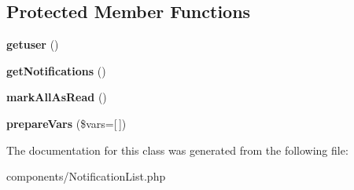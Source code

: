 \subsection*{Protected Member Functions}
\begin{DoxyCompactItemize}
\item 
\hypertarget{classDMA_1_1Friends_1_1Components_1_1NotificationList_a074dd7aca870f19ec427cd5a5d7ac251}{{\bfseries getuser} ()}\label{classDMA_1_1Friends_1_1Components_1_1NotificationList_a074dd7aca870f19ec427cd5a5d7ac251}

\item 
\hypertarget{classDMA_1_1Friends_1_1Components_1_1NotificationList_adc479f44c9f83683592e2b9bbfc8d814}{{\bfseries get\-Notifications} ()}\label{classDMA_1_1Friends_1_1Components_1_1NotificationList_adc479f44c9f83683592e2b9bbfc8d814}

\item 
\hypertarget{classDMA_1_1Friends_1_1Components_1_1NotificationList_a5eef82282d782ab43559e31143472542}{{\bfseries mark\-All\-As\-Read} ()}\label{classDMA_1_1Friends_1_1Components_1_1NotificationList_a5eef82282d782ab43559e31143472542}

\item 
\hypertarget{classDMA_1_1Friends_1_1Components_1_1NotificationList_a2e4271c838bd10f2790ae7ac1cb83638}{{\bfseries prepare\-Vars} (\$vars=\mbox{[}$\,$\mbox{]})}\label{classDMA_1_1Friends_1_1Components_1_1NotificationList_a2e4271c838bd10f2790ae7ac1cb83638}

\end{DoxyCompactItemize}


The documentation for this class was generated from the following file\-:\begin{DoxyCompactItemize}
\item 
components/Notification\-List.\-php\end{DoxyCompactItemize}
